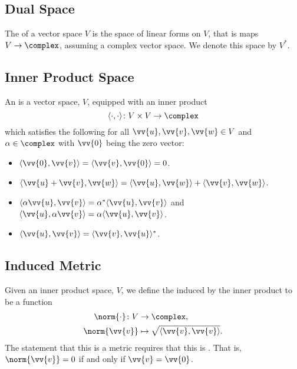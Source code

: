     \subsection{Dual Space}
    The  of a vector space \(V\) is the space of linear forms on \(V\), that is maps \(V \to \complex\), assuming a complex vector space.
    We denote this space by \(V^*\).
    
    \subsection{Inner Product Space}
    An  is a vector space, \(V\), equipped with an inner product
    \begin{equation}
        \langle \cdot, \cdot \rangle \colon V \times V \to \complex
    \end{equation}
    which satisfies the following for all \(\vv{u}, \vv{v}, \vv{w} \in V\) and \(\alpha \in \complex\) with \(\vv{0}\) being the zero vector:
    \begin{itemize}
        \item \(\langle \vv{0}, \vv{v} \rangle = \langle \vv{v}, \vv{0} \rangle = 0\).
        \item \(\langle \vv{u} + \vv{v}, \vv{w} \rangle = \langle \vv{u}, \vv{w} \rangle + \langle \vv{v}, \vv{w} \rangle\).
        \item \(\langle \alpha\vv{u}, \vv{v} \rangle = \alpha^*\langle \vv{u}, \vv{v} \rangle\) and \(\langle \vv{u}, \alpha\vv{v} \rangle = \alpha\langle \vv{u}, \vv{v} \rangle\).
        \item \(\langle \vv{u}, \vv{v} \rangle = \langle \vv{v}, \vv{u} \rangle^*\).
    \end{itemize}
    
    \subsection{Induced Metric}
    Given an inner product space, \(V\), we define the  induced by the inner product to be a function
    \begin{align}
        \norm{\cdot} \colon V &\to \complex,\\
        \norm{\vv{v}} &\mapsto \sqrt{\langle \vv{v}, \vv{v}\rangle}.
    \end{align}
    The statement that this is a metric requires that this is .
    That is, \(\norm{\vv{v}} = 0\) if and only if \(\vv{v} = \vv{0}\).
    
